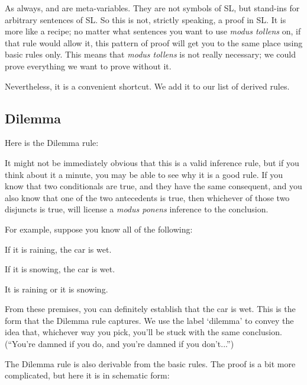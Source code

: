As always, \metaA{} and \metaB{} are meta-variables. They are not symbols of SL, but stand-ins for arbitrary sentences of SL. So this is not, strictly speaking, a proof in SL. It is more like a recipe; no matter what sentences you want to use \emph{modus tollens} on, if that rule would allow it, this pattern of proof will get you to the same place using basic rules only. This means that \emph{modus tollens} is not really necessary; we could prove everything we want to prove without it.

Nevertheless, it is a convenient shortcut. We add it to our list of derived rules.

\subsection{Dilemma}


Here is the Dilemma rule:

\begin{ndproof}
	 
\end{ndproof}

It might not be immediately obvious that this is a valid inference rule, but if you think about it a minute, you may be able to see why it is a good rule. If you know that two conditionals are true, and they have the same consequent, and you also know that one of the two antecedents is true, then whichever of those two disjuncts is true, will license a \emph{modus ponens} inference to the conclusion.

For example, suppose you know all of the following:

\begin{earg}
\item[] If it is raining, the car is wet.
\item[] If it is snowing, the car is wet.
\item[] It is raining or it is snowing.
\end{earg}

From these premises, you can definitely establish that the car is wet. This is the form that the Dilemma rule captures. We use the label `dilemma' to convey the idea that, whichever way you pick, you'll be stuck with the same conclusion. (``You're damned if you do, and you're damned if you don't...'')

The Dilemma rule is also derivable from the basic rules. The proof is a bit more complicated, but here it is in schematic form:


